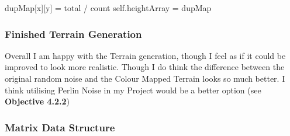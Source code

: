 \begin{flushleft}
\begin{pythoncode}
            dupMap[x][y] = total / count
    self.heightArray = dupMap
            \end{pythoncode}
            \subsubsection{Finished Terrain Generation}
            \vspace{0.25cm}

            Overall I am happy with the Terrain generation, though I feel as if it could be improved to look more realistic.
            Though I do think the difference between the original random noise and the Colour Mapped Terrain looks so much better. I
            think utilising Perlin Noise in my Project would be a better option (see \textbf{Objective 4.2.2})

            \begin{figure}[h]
                \centering
                \qquad
            \end{figure}
            \subsubsection{Matrix Data Structure}
                \vspace{0.25cm}


\end{flushleft}
